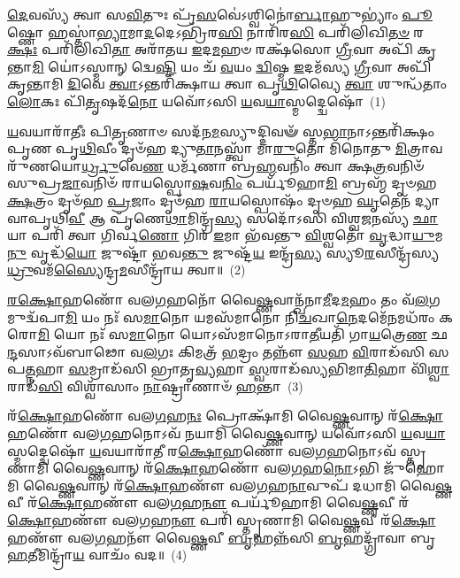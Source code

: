 \setcounter{anuvakam}{0}
\-\ul{𑌦𑍇}\-𑌵𑌸𑍍𑌯᳴ 𑌤𑍍𑌵𑌾 𑌸\-\ul{𑌵𑌿}\-𑌤𑍁𑌃 𑌪𑍍𑌰᳴\-\ul{𑌸}\-𑌵𑍇॑\-𑌽𑌶𑍍𑌵𑌿𑌨𑍋॑\-\ul{𑌰𑍍𑌬𑌾}\-𑌹𑍁\-𑌭𑍍𑌯𑌾𑌂॑ \ul{𑌪𑍂}\-𑌷𑍍𑌣𑍋 𑌹𑌸𑍍𑌤𑌾॑\-\ul{𑌭𑍍𑌯𑌾}\-𑌮𑌾\-\ul{𑌦}\-𑌦𑍇\-𑌽𑌭𑍍𑌰𑌿᳴𑌰\-\ul{𑌸𑌿} 𑌨𑌾𑌰𑌿᳴𑌰\-\ul{𑌸𑌿} 𑌪𑌰𑌿᳴𑌲𑌿𑌖𑌿\-\ul{𑌤}\-\-\ul{𑍞} 𑌰\-\ul{𑌕𑍍𑌷𑌃} 𑌪𑌰𑌿᳴𑌲𑌿𑌖𑌿\-\ul{𑌤𑌾} 𑌅𑌰𑌾᳴𑌤𑌯 \ul{𑌇}\-𑌦\-\ul{𑌮}\-𑌹𑍞 𑌰𑌕𑍍𑌷᳴𑌸𑍋 \ul{𑌗𑍍𑌰𑍀}\-𑌵𑌾 𑌅𑌪𑌿᳴ 𑌕𑍃𑌨𑍍𑌤𑌾\-\ul{𑌮𑌿} 𑌯𑍋॑\-𑌽𑌸𑍍𑌮𑌾𑌨𑍍 𑌦𑍍𑌵𑍇\-\ul{𑌷𑍍𑌟𑌿} 𑌯𑌂 𑌚᳴ \ul{𑌵}\-𑌯𑌂 \ul{𑌦𑍍𑌵𑌿}\-𑌷𑍍𑌮 \ul{𑌇}\-𑌦𑌮᳴𑌸𑍍𑌯 \ul{𑌗𑍍𑌰𑍀}\-𑌵𑌾 𑌅𑌪𑌿᳴ 𑌕𑍃𑌨𑍍𑌤𑌾𑌮𑌿 \ul{𑌦𑌿}\-𑌵𑍇 \ul{𑌤𑍍𑌵𑌾}\-\-𑌽𑌨𑍍𑌤𑌰𑌿᳴𑌕𑍍𑌷𑌾𑌯 𑌤𑍍𑌵𑌾 𑌪𑍃\-\ul{𑌥𑌿}\-𑌵𑍍𑌯𑍈 \ul{𑌤𑍍𑌵𑌾} 𑌶𑍁𑌨𑍍𑌧᳴𑌤𑌾𑌂 \ul{𑌲𑍋}\-𑌕𑌃 𑌪𑌿᳴\-\ul{𑌤𑍃}\-𑌷𑌦᳴\-\ul{𑌨𑍋} 𑌯𑌵𑍋᳴\-𑌽𑌸𑌿 \ul{𑌯}\-𑌵\-\ul{𑌯𑌾}\-𑌸𑍍𑌮𑌦𑍍𑌦𑍍𑌵𑍇𑌷𑍋᳴~(1)

\-\ul{𑌯}\-𑌵𑌯𑌾𑌰𑌾᳴𑌤𑍀𑌃 𑌪𑌿\-\ul{𑌤𑍃}\-𑌣𑌾𑍞 𑌸𑌦᳴𑌨\-\ul{𑌮}\-𑌸𑍍𑌯𑍁𑌦𑍍𑌦𑌿𑌵𑍟᳴ 𑌸𑍍𑌤\-\ul{𑌭𑌾}\-𑌨𑌾\-𑌽𑌨𑍍𑌤𑌰𑌿᳴𑌕𑍍𑌷𑌂 𑌪𑍃𑌣 𑌪𑍃\-\ul{𑌥𑌿}\-𑌵𑍀𑌂 𑌦𑍃𑍞᳴𑌹 𑌦𑍍𑌯𑍁\-\ul{𑌤𑌾}\-𑌨𑌸𑍍𑌤𑍍𑌵𑌾᳴ 𑌮𑌾\-\ul{𑌰𑍁}\-𑌤𑍋 𑌮𑌿᳴𑌨𑍋𑌤𑍁 \ul{𑌮𑌿}\-𑌤𑍍𑌰𑌾𑌵𑌰𑍁᳴𑌣𑌯𑍋\-\ul{𑌰𑍍𑌧𑍍𑌰𑍁}\-𑌵𑍇\-\ul{𑌣} 𑌧𑌰𑍍𑌮᳴𑌣𑌾 𑌬𑍍𑌰\-\ul{𑌹𑍍𑌮}\-𑌵𑌨𑌿𑌂᳴ 𑌤𑍍𑌵𑌾 𑌕𑍍𑌷\-\ul{𑌤𑍍𑌰}\-𑌵𑌨𑌿𑍞᳴ 𑌸𑍁𑌪𑍍𑌰\-\ul{𑌜𑌾}\-𑌵𑌨𑌿𑍞᳴ 𑌰𑌾𑌯𑌸𑍍𑌪𑍋\-\ul{𑌷}\-𑌵\-\ul{𑌨𑌿𑌂} 𑌪𑌰𑍍𑌯𑍂᳴𑌹𑌾\-\ul{𑌮𑌿} 𑌬𑍍𑌰𑌹𑍍𑌮᳴ 𑌦𑍃𑍞𑌹 \ul{𑌕𑍍𑌷}\-𑌤𑍍𑌰𑌂 𑌦𑍃𑍞᳴𑌹 \ul{𑌪𑍍𑌰}\-𑌜𑌾𑌂 𑌦𑍃𑍞᳴𑌹 \ul{𑌰𑌾}\-𑌯𑌸𑍍𑌪𑍋𑌷𑌂᳴ 𑌦𑍃𑍞𑌹 \ul{𑌘𑍃}\-𑌤𑍇𑌨᳴ 𑌦𑍍𑌯𑌾𑌵𑌾𑌪𑍃𑌥𑌿\-\ul{𑌵𑍀} 𑌆 𑌪𑍃᳴𑌣𑍇\-\ul{𑌥𑌾}\-𑌮𑌿𑌨𑍍𑌦𑍍𑌰᳴\-\ul{𑌸𑍍𑌯} 𑌸𑌦𑍋᳴\-𑌽𑌸𑌿 𑌵𑌿𑌶𑍍𑌵\-\ul{𑌜}\-𑌨𑌸𑍍𑌯᳴ \ul{𑌛𑌾}\-𑌯𑌾 𑌪𑌰𑌿᳴ 𑌤𑍍𑌵𑌾 𑌗𑌿𑌰𑍍𑌵\-\ul{𑌣𑍋} 𑌗𑌿𑌰᳴ \ul{𑌇}\-𑌮𑌾 𑌭᳴𑌵𑌨𑍍𑌤𑍁 \ul{𑌵𑌿}\-𑌶𑍍𑌵𑌤𑍋᳴ \ul{𑌵𑍃}\-𑌦𑍍𑌧𑌾\-\ul{𑌯𑍁}\-𑌮\-\ul{𑌨𑍁} 𑌵𑍃𑌦𑍍𑌧᳴\-\ul{𑌯𑍋} 𑌜𑍁𑌷𑍍𑌟𑌾᳴ 𑌭𑌵\-\ul{𑌨𑍍𑌤𑍁} 𑌜𑍁𑌷𑍍𑌟᳴\-\ul{𑌯} 𑌇𑌨𑍍𑌦𑍍𑌰᳴\-\ul{𑌸𑍍𑌯} 𑌸𑍍𑌯𑍂\-\ul{𑌰}\-𑌸𑍀𑌨𑍍𑌦𑍍𑌰᳴𑌸𑍍𑌯 \ul{𑌧𑍍𑌰𑍁}\-𑌵𑌮᳴\-\ul{𑌸𑍍𑌯𑍈}\-𑌨𑍍𑌦𑍍𑌰\-\ul{𑌮}\-𑌸𑍀𑌨𑍍𑌦𑍍𑌰𑌾᳴𑌯 𑌤𑍍𑌵𑌾॥~(2)

{\anuvakamend[{𑌦𑍍𑌵𑍇𑌷᳴ \ul{𑌇}\-𑌮𑌾 \ul{𑌅}\-𑌷𑍍𑌟𑌾𑌦᳴𑌶 𑌚}]}%

\-\ul{𑌰}\-\-\ul{𑌕𑍍𑌷𑍋}\-𑌹𑌣𑍋᳴ 𑌵𑌲\-\ul{𑌗}\-𑌹𑌨𑍋᳴ 𑌵𑍈\-\ul{𑌷𑍍𑌣}\-𑌵𑌾𑌨𑍍𑌖᳴𑌨𑌾\-\ul{𑌮𑍀}\-𑌦\-\ul{𑌮}\-𑌹𑌂 𑌤𑌂 𑌵᳴\-\ul{𑌲}\-𑌗𑌮𑍁𑌦𑍍𑌵᳴𑌪𑌾\-\ul{𑌮𑌿} 𑌯𑌂 𑌨𑌃᳴ 𑌸\-\ul{𑌮𑌾}\-𑌨𑍋 𑌯𑌮𑌸᳴𑌮𑌾𑌨𑍋 𑌨𑌿\-\ul{𑌚}\-𑌖𑌾\-\ul{𑌨𑍇}\-𑌦𑌮𑍇᳴\-\ul{𑌨}\-𑌮𑌧᳴𑌰𑌂 𑌕𑌰𑍋\-\ul{𑌮𑌿} 𑌯𑍋 𑌨𑌃᳴ 𑌸\-\ul{𑌮𑌾}\-𑌨𑍋 𑌯𑍋\-𑌽𑌸᳴𑌮𑌾𑌨𑍋\-𑌽𑌰𑌾\-\ul{𑌤𑍀}\-𑌯𑌤𑌿᳴ 𑌗𑌾\-\ul{𑌯}\-𑌤𑍍𑌰𑍇\-\ul{𑌣} 𑌛\-\ul{𑌨𑍍𑌦}\-𑌸𑌾\-𑌽𑌵᳴𑌬𑌾𑌢𑍋 𑌵\-\ul{𑌲}\-𑌗𑌃 𑌕𑌿𑌮𑌤𑍍𑌰᳴ \ul{𑌭}\-𑌦𑍍𑌰𑌂 𑌤𑌨𑍍𑌨𑍗᳴ \ul{𑌸}\-𑌹 \ul{𑌵𑌿}\-𑌰𑌾𑌡᳴𑌸𑌿 𑌸𑌪\-\ul{𑌤𑍍𑌨}\-𑌹𑌾 \ul{𑌸}\-𑌮𑍍𑌰𑌾𑌡᳴𑌸𑌿 𑌭𑍍𑌰𑌾𑌤𑍃\-\ul{𑌵𑍍𑌯}\-𑌹𑌾 \ul{𑌸𑍍𑌵}\-𑌰𑌾𑌡᳴𑌸𑍍𑌯𑌭𑌿𑌮𑌾\-\ul{𑌤𑌿}\-𑌹𑌾 𑌵𑌿᳴\-\ul{𑌶𑍍𑌵𑌾}\-𑌰𑌾𑌡᳴\-\ul{𑌸𑌿} 𑌵𑌿𑌶𑍍𑌵𑌾᳴𑌸𑌾𑌂 \ul{𑌨𑌾}\-𑌷𑍍𑌟𑍍𑌰𑌾𑌣𑌾𑍞᳴ \ul{𑌹}\-𑌨𑍍𑌤𑌾~(3)

𑌰᳴\-\ul{𑌕𑍍𑌷𑍋}\-𑌹𑌣𑍋᳴ 𑌵𑌲\-\ul{𑌗}\-𑌹\-\ul{𑌨𑌃} 𑌪𑍍𑌰𑍋𑌕𑍍𑌷𑌾᳴𑌮𑌿 𑌵𑍈\-\ul{𑌷𑍍𑌣}\-𑌵𑌾𑌨𑍍 𑌰᳴\-\ul{𑌕𑍍𑌷𑍋}\-𑌹𑌣𑍋᳴ 𑌵𑌲\-\ul{𑌗}\-𑌹𑌨𑍋\-𑌽𑌵᳴ 𑌨𑌯𑌾𑌮𑌿 𑌵𑍈\-\ul{𑌷𑍍𑌣}\-𑌵𑌾𑌨𑍍 𑌯𑌵𑍋᳴\-𑌽𑌸𑌿 \ul{𑌯}\-𑌵\-\ul{𑌯𑌾}\-𑌸𑍍𑌮𑌦𑍍𑌦𑍍𑌵𑍇𑌷𑍋᳴ \ul{𑌯}\-𑌵𑌯𑌾𑌰𑌾᳴𑌤𑍀 𑌰\-\ul{𑌕𑍍𑌷𑍋}\-𑌹𑌣𑍋᳴ 𑌵𑌲\-\ul{𑌗}\-𑌹𑌨𑍋\-𑌽𑌵᳴ 𑌸𑍍𑌤𑍃𑌣𑌾𑌮𑌿 𑌵𑍈\-\ul{𑌷𑍍𑌣}\-𑌵𑌾𑌨𑍍 𑌰᳴\-\ul{𑌕𑍍𑌷𑍋}\-𑌹𑌣𑍋᳴ 𑌵𑌲\-\ul{𑌗}\-𑌹\-\ul{𑌨𑍋}\-\-𑌽𑌭𑌿 𑌜𑍁᳴𑌹𑍋𑌮𑌿 𑌵𑍈\-\ul{𑌷𑍍𑌣}\-𑌵𑌾𑌨𑍍 𑌰᳴\-\ul{𑌕𑍍𑌷𑍋}\-𑌹𑌣𑍗᳴ 𑌵𑌲\-\ul{𑌗}\-𑌹\-\ul{𑌨𑌾}\-𑌵𑍁𑌪᳴ 𑌦𑌧𑌾𑌮𑌿 𑌵𑍈\-\ul{𑌷𑍍𑌣}\-𑌵𑍀 𑌰᳴\-\ul{𑌕𑍍𑌷𑍋}\-𑌹𑌣𑍗᳴ 𑌵𑌲\-\ul{𑌗}\-𑌹\-\ul{𑌨𑍗} 𑌪𑌰𑍍𑌯𑍂᳴𑌹𑌾𑌮𑌿 𑌵𑍈\-\ul{𑌷𑍍𑌣}\-𑌵𑍀 𑌰᳴\-\ul{𑌕𑍍𑌷𑍋}\-𑌹𑌣𑍗᳴ 𑌵𑌲\-\ul{𑌗}\-𑌹\-\ul{𑌨𑍗} 𑌪𑌰𑌿᳴ 𑌸𑍍𑌤𑍃𑌣𑌾𑌮𑌿 𑌵𑍈\-\ul{𑌷𑍍𑌣}\-𑌵𑍀 𑌰᳴\-\ul{𑌕𑍍𑌷𑍋}\-𑌹𑌣𑍗᳴ 𑌵𑌲\-\ul{𑌗}\-𑌹𑌨𑍗᳴ 𑌵𑍈\-\ul{𑌷𑍍𑌣}\-𑌵𑍀 \ul{𑌬𑍃}\-𑌹𑌨𑍍𑌨᳴𑌸𑌿 \ul{𑌬𑍃}\-𑌹𑌦𑍍𑌗𑍍𑌰𑌾᳴𑌵𑌾 𑌬𑍃\-\ul{𑌹}\-𑌤𑍀𑌮𑌿𑌨𑍍𑌦𑍍𑌰𑌾᳴\-\ul{𑌯} 𑌵𑌾𑌚𑌂᳴ 𑌵𑌦॥~(4)


